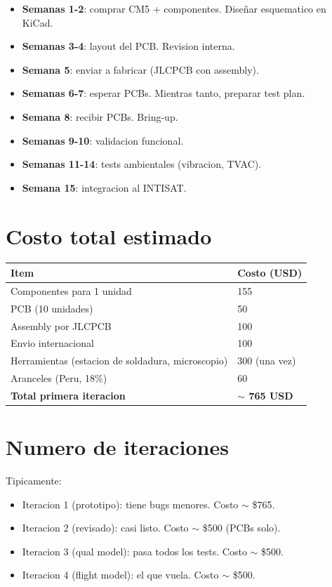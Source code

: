 \documentclass[11pt,a4paper,oneside,openright]{book}
\begin{document}
\begin{itemize}[leftmargin=2em]
  \item \textbf{Semanas 1-2}: comprar CM5 + componentes. Diseñar
        esquematico en KiCad.
  \item \textbf{Semanas 3-4}: layout del PCB. Revision interna.
  \item \textbf{Semana 5}: enviar a fabricar (JLCPCB con assembly).
  \item \textbf{Semanas 6-7}: esperar PCBs. Mientras tanto, preparar
        test plan.
  \item \textbf{Semana 8}: recibir PCBs. Bring-up.
  \item \textbf{Semanas 9-10}: validacion funcional.
  \item \textbf{Semanas 11-14}: tests ambientales (vibracion, TVAC).
  \item \textbf{Semana 15}: integracion al INTISAT.
\end{itemize}

\section{Costo total estimado}

\begin{center}
\begin{tabular}{ll}
\toprule
\textbf{Item} & \textbf{Costo (USD)} \\
\midrule
Componentes para 1 unidad      & 155 \\
PCB (10 unidades)              & 50 \\
Assembly por JLCPCB            & 100 \\
Envio internacional            & 100 \\
Herramientas (estacion de soldadura, microscopio) & 300 (una vez) \\
Aranceles (Peru, 18\%)          & 60 \\
\midrule
\textbf{Total primera iteracion} & \textbf{$\sim$ 765 USD} \\
\bottomrule
\end{tabular}
\end{center}

\section{Numero de iteraciones}

Tipicamente:
\begin{itemize}[leftmargin=2em]
  \item Iteracion 1 (prototipo): tiene bugs menores. Costo $\sim$ \$765.
  \item Iteracion 2 (revisado): casi listo. Costo $\sim$ \$500 (PCBs solo).
  \item Iteracion 3 (qual model): pasa todos los tests. Costo $\sim$ \$500.
  \item Iteracion 4 (flight model): el que vuela. Costo $\sim$ \$500.
\end{itemize}
\end{document}
